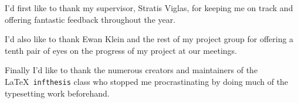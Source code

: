 \begin{acknowledgements}

	I'd first like to thank my supervisor, Stratis Viglas, for keeping me on
	track and offering fantastic feedback throughout the year.

	I'd also like to thank Ewan Klein and the rest of my project group for
	offering a tenth pair of eyes on the progress of my project at our
	meetings.

	Finally I'd like to thank the numerous creators and maintainers of the
	\LaTeX\ \texttt{infthesis} class who stopped me procrastinating by doing
	much of the typesetting work beforehand.

\end{acknowledgements}
